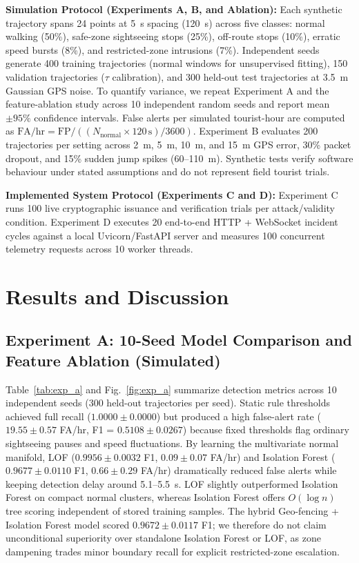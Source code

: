 \documentclass[conference]{IEEEtran}
\begin{document}
\textbf{Simulation Protocol (Experiments A, B, and Ablation):} Each synthetic trajectory spans 24 points at 5~s spacing (120~s) across five classes: normal walking (50\%), safe-zone sightseeing stops (25\%), off-route stops (10\%), erratic speed bursts (8\%), and restricted-zone intrusions (7\%). Independent seeds generate 400 training trajectories (normal windows for unsupervised fitting), 150 validation trajectories ($\tau$ calibration), and 300 held-out test trajectories at 3.5~m Gaussian GPS noise. To quantify variance, we repeat Experiment A and the feature-ablation study across 10 independent random seeds and report mean $\pm 95\%$ confidence intervals. False alerts per simulated tourist-hour are computed as $\text{FA/hr} = \text{FP} / ((N_{\text{normal}} \times 120\,\text{s}) / 3600)$. Experiment B evaluates 200 trajectories per setting across 2~m, 5~m, 10~m, and 15~m GPS error, 30\% packet dropout, and 15\% sudden jump spikes (60--110~m). Synthetic tests verify software behaviour under stated assumptions and do not represent field tourist trials.

\textbf{Implemented System Protocol (Experiments C and D):} Experiment C runs 100 live cryptographic issuance and verification trials per attack/validity condition. Experiment D executes 20 end-to-end HTTP + WebSocket incident cycles against a local Uvicorn/FastAPI server and measures 100 concurrent telemetry requests across 10 worker threads.

\section{Results and Discussion}

\subsection{Experiment A: 10-Seed Model Comparison and Feature Ablation (Simulated)}
Table~\ref{tab:exp_a} and Fig.~\ref{fig:exp_a} summarize detection metrics across 10 independent seeds (300 held-out trajectories per seed). Static rule thresholds achieved full recall ($1.0000 \pm 0.0000$) but produced a high false-alert rate ($19.55 \pm 0.57$ FA/hr, F1 = $0.5108 \pm 0.0267$) because fixed thresholds flag ordinary sightseeing pauses and speed fluctuations. By learning the multivariate normal manifold, LOF ($0.9956 \pm 0.0032$ F1, $0.09 \pm 0.07$ FA/hr) and Isolation Forest ($0.9677 \pm 0.0110$ F1, $0.66 \pm 0.29$ FA/hr) dramatically reduced false alerts while keeping detection delay around 5.1--5.5~s. LOF slightly outperformed Isolation Forest on compact normal clusters, whereas Isolation Forest offers $O(\log n)$ tree scoring independent of stored training samples. The hybrid Geo-fencing + Isolation Forest model scored $0.9672 \pm 0.0117$ F1; we therefore do not claim unconditional superiority over standalone Isolation Forest or LOF, as zone dampening trades minor boundary recall for explicit restricted-zone escalation.
\end{document}
